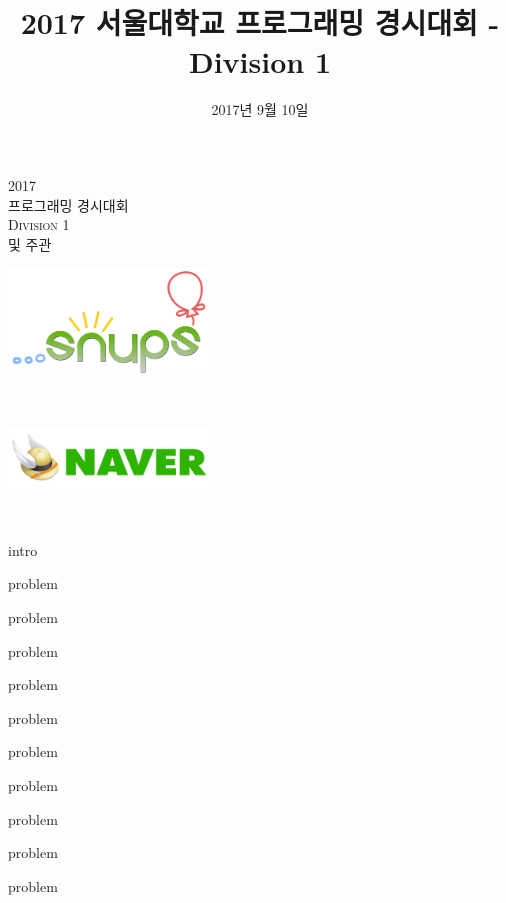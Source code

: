 \documentclass[11pt,a4paper,oneside,final]{article}
\title{2017 서울대학교 프로그래밍 경시대회 - Division 1}
\date{2017년 9월 10일}
\begin{document}
\begin{titlepage}
\begin{center}

\vspace*{3cm}

\textsc{\Huge2017}\\[0.5cm]
\textsc{ 프로그래밍 경시대회}\\[1cm]
\textsc{\Huge Division 1}\\[2cm]

\vspace{2cm}
\textsc{ 및 주관}\\[0.0cm]

\begin{center}
\includegraphics[width=0.4\textwidth]{snups.png}
\end{center}

\vspace{1cm}
\textsc{}\\[0.0cm]

\begin{center}
\includegraphics[width=0.4\textwidth]{naver.jpg}
\end{center}

\vspace{1cm}
\textsc{\Large \THEDATE}\\[0.5cm]

\vspace*{\fill}

\end{center}
\end{titlepage}

{intro}

{problem}

{problem}

{problem}

{problem}

{problem}


{problem}

{problem}

{problem}

{problem}

{problem}
\end{document}
